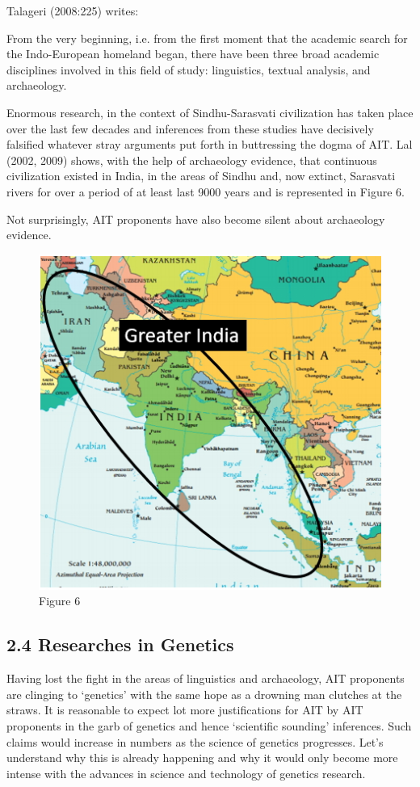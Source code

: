 Talageri (2008:225) writes:

\begin{myquote}
From the very beginning, i.e. from the first moment that the academic search for the Indo-European homeland began, there have been three broad academic disciplines involved in this field of study: linguistics, textual analysis, and archaeology.
\end{myquote}

Enormous research, in the context of Sindhu-Sarasvati civilization has taken place over the last few decades and inferences from these studies have decisively falsified whatever stray arguments put forth in buttressing the dogma of AIT. Lal (2002, 2009) shows, with the help of archaeology evidence, that continuous civilization existed in India, in the areas of Sindhu and, now extinct, Sarasvati rivers for over a period of at least last 9000 years and is represented in Figure 6.

Not surprisingly, AIT proponents have also become silent about archaeology evidence.

\begin{figure}
\includegraphics{"images/8-06.jpg"}
\caption{Figure 6}
\end{figure}


\subsection{2.4 Researches in Genetics}

Having lost the fight in the areas of linguistics and archaeology, AIT proponents are clinging to ‘genetics’ with the same hope as a drowning man clutches at the straws. It is reasonable to expect lot more justifications for AIT by AIT proponents in the garb of genetics and hence ‘scientific sounding’ inferences. Such claims would increase in numbers as the science of genetics progresses. Let’s understand why this is already happening and why it would only become more intense with the advances in science and technology of genetics research.


